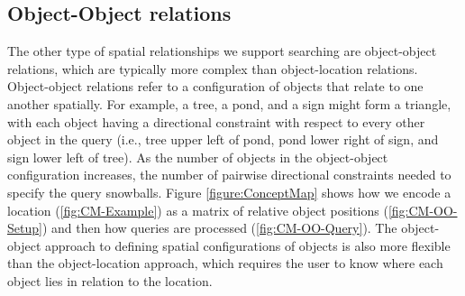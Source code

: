 \subsection{Object-Object relations}
The other type of spatial relationships we support searching are object-object relations, which are typically more complex than object-location relations.
Object-object relations refer to a configuration of objects that relate to one another spatially.
For example, a tree, a pond, and a sign might form a triangle, with each object having a directional constraint with respect to every other object in the query (i.e., tree upper left of pond, pond lower right of sign, and sign lower left of tree).
As the number of objects in the object-object configuration increases, the number of pairwise directional constraints needed to specify the query snowballs. 
Figure \ref{figure:ConceptMap} shows how we encode a location (\ref{fig:CM-Example}) as a matrix of relative object positions (\ref{fig:CM-OO-Setup}) and then how queries are processed (\ref{fig:CM-OO-Query}).
The object-object approach to defining spatial configurations of objects is also more flexible than the object-location approach, which requires the user to know where each object lies in relation to the location. 



